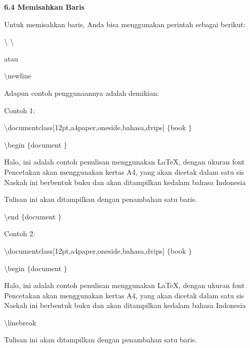 \vspace{12pt}
\vspace{12pt}
\textbf{6.4 Memisahkan Baris} \par
Untuk memisahkan baris, Anda bisa menggunakan perintah sebagai berikut: \par
 $  \setminus  $ $  \setminus  $ \par
atau \par
{\fontsize{10pt}{10pt}\selectfont  $  \setminus  $newline} \par
\vspace{12pt}
Adapun contoh penggunaannya adalah demikian: \par
Contoh 1: \par
{\fontsize{10pt}{10pt}\selectfont  $  \setminus  $documentclass[12pt,a4paper,oneside,bahasa,dvips] $  \{  $book $  \}  $} \par
{\fontsize{10pt}{10pt}\selectfont  $  \setminus  $begin $  \{  $document $  \}  $} \par
\vspace{10pt}
{\fontsize{10pt}{10pt}\selectfont Halo, ini adalah contoh penulisan menggunakan LaTeX, dengan ukuran font Pencetakan akan menggunakan kertas A4, yang akan dicetak dalam satu sis Naskah ini berbentuk buku dan akan ditampilkan kedalam bahasa Indonesia} \par
\vspace{10pt}
{\fontsize{10pt}{10pt}\selectfont Tulisan ini akan ditampilkan dengan penambahan satu baris.} \par
{\fontsize{10pt}{10pt}\selectfont  $  \setminus  $end $  \{  $document $  \}  $} \par
\vspace{10pt}
Contoh 2: \par
{\fontsize{10pt}{10pt}\selectfont  $  \setminus  $documentclass[12pt,a4paper,oneside,bahasa,dvips] $  \{  $book $  \}  $} \par
{\fontsize{10pt}{10pt}\selectfont  $  \setminus  $begin $  \{  $document $  \}  $} \par
\vspace{10pt}
{\fontsize{10pt}{10pt}\selectfont Halo, ini adalah contoh penulisan menggunakan LaTeX, dengan ukuran font Pencetakan akan menggunakan kertas A4, yang akan dicetak dalam satu sis Naskah ini berbentuk buku dan akan ditampilkan kedalam bahasa Indonesia} \par
\vspace{10pt}
{\fontsize{10pt}{10pt}\selectfont  $  \setminus  $linebreak} \par
{\fontsize{10pt}{10pt}\selectfont Tulisan ini akan ditampilkan dengan penambahan satu baris.} \par


